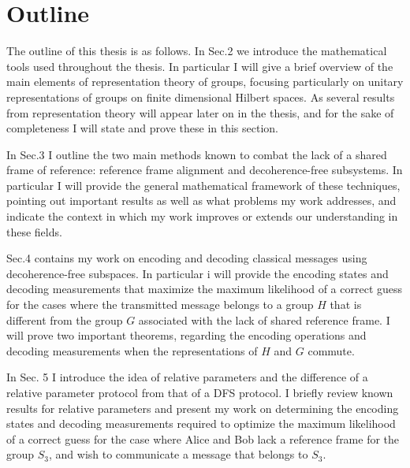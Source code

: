 \documentclass{article}
\begin{document}
\section{Outline}

The outline of this thesis is as follows.  In Sec.2 we introduce the mathematical tools used throughout the thesis.  In particular I will give a brief overview of the main elements of representation theory of groups, focusing particularly on unitary representations of groups on finite dimensional Hilbert spaces. As several results from representation theory will appear later on in the thesis, and for the sake of completeness I will  state and prove these in this section.

In Sec.3 I outline the two main methods known to combat the lack of a shared frame of reference: reference frame alignment and decoherence-free subsystems.  In particular I will provide the general mathematical framework of these techniques, pointing out important results as well as what problems my work addresses, and indicate the context in which my work improves or extends our understanding in these fields.  

Sec.4 contains my work on encoding and decoding classical messages using decoherence-free subspaces.  In particular i will provide the encoding states and decoding measurements that maximize the maximum likelihood of a correct guess for the cases where the transmitted message belongs to a group $H$ that is different from the group $G$ associated with the lack of shared reference frame. I will prove two important theorems, regarding the encoding operations and decoding measurements when the representations of $H$ and $G$ commute.

In Sec. 5 I introduce the idea of relative parameters and the difference of a relative parameter protocol from that of a DFS protocol.  I briefly review known results for relative parameters and present my work on determining the encoding states and decoding measurements required to optimize the maximum likelihood of a correct guess for the case where Alice and Bob lack a reference frame for the group $S_3$, and wish to communicate a message that belongs to $S_3$. 
\end{document}
